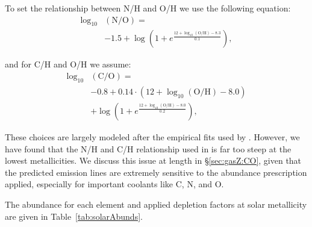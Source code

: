 \documentclass[preprint2]{aastex61}
\begin{document}
To set the relationship between N/H and O/H we use the following equation:
\begin{equation}\label{eq:nitrogen}
\begin{aligned}
    \log_{10}&(\mathrm{N}/\mathrm{O}) = \\
    & -1.5 + \log\left( 1 + e^{\frac{12 + \log_{10}(\mathrm{O}/\mathrm{H})-8.3}{0.1}}\right),
\end{aligned}
\end{equation}

and for C/H and O/H we assume:
\begin{equation}\label{eq:carbon}
\begin{aligned}
    \log_{10}&(\mathrm{C}/\mathrm{O}) = \\
    & -0.8 + 0.14\cdot\left(12 + \log_{10}(\mathrm{O}/\mathrm{H})-8.0\right) \\
    & + \log\left( 1 + e^{\frac{12 + \log_{10}(\mathrm{O}/\mathrm{H})-8.0}{0.2}}\right),
\end{aligned}
\end{equation}

These choices are largely modeled after the empirical fits used by \citet{Dopita+2013}. However, we have found that the N/H and C/H relationship used in \citet{Dopita+2013} is far too steep at the lowest metallicities. We discuss this issue at length in \S\ref{sec:gasZ:CO}, given that the predicted emission lines are extremely sensitive to the abundance prescription applied, especially for important coolants like C, N, and O. 

The abundance for each element and applied depletion factors at solar metallicity are given in Table~\ref{tab:solarAbunds}.
\end{document}
